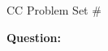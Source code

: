 \documentclass{article}
\theoremstyle{plain}
\theoremstyle{definition}
\theoremstyle{remark}
\begin{document}
\begin{center}
\begin{LARGE}
CC Problem Set \#
\end{LARGE}
\end{center}

\begin{tcolorbox}
	\textbf{Question:}
\end{tcolorbox}
\end{document}
